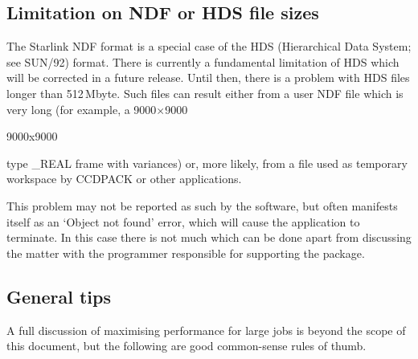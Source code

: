 \documentclass[twoside,11pt]{article}
\newenvironment{latexonly}{}{}
\newcommand{\xref}[3]{#1}
\newcommand{\xlabel}[1]{}
\begin{document}
\subsection{\xlabel{HDS-LIMIT}Limitation on NDF or HDS file sizes}

The Starlink NDF format is a special case of the HDS (Hierarchical Data
System; see \xref{SUN/92}{sun92}{}\cite{SUN92}) format.
There is currently a fundamental limitation of HDS which will be corrected
in a future release.
Until then, there is a problem with HDS files longer than 512\,Mbyte. 
Such files can result either from a user NDF file which is very long 
(for example, a 
\begin{latexonly} 
9000$\times$9000 
\end{latexonly}
\begin{htmlonly} 
9000x9000 
\end{htmlonly}
type \_REAL frame with variances) or, more likely,
from a file used as temporary workspace by CCDPACK or other applications.

This problem may not be reported as such by the software,
but often manifests itself as an `Object not found' error,
which will cause the application to terminate.
In this case there is not much which can be done apart from
discussing the matter with the programmer 
responsible for supporting the package.

\subsection{\xlabel{LARGE-GENERAL}General tips}

A full discussion of maximising performance for large jobs 
is beyond the scope of this document, 
but the following are good common-sense rules of thumb.
\end{document}
